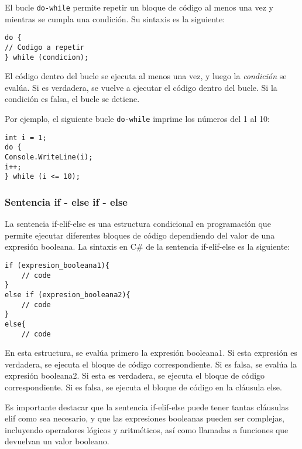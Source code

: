 \documentclass[executivepaper]{article}
\begin{document}
El bucle \verb|do-while| permite repetir un bloque de código al menos una vez y mientras se cumpla una condición. Su sintaxis es la siguiente:

\begin{lstlisting}
do {
// Codigo a repetir
} while (condicion);
\end{lstlisting}

El código dentro del bucle se ejecuta al menos una vez, y luego la \emph{condición} se evalúa. Si es verdadera, se vuelve a ejecutar el código dentro del bucle. Si la condición es falsa, el bucle se detiene.

Por ejemplo, el siguiente bucle \verb|do-while| imprime los números del 1 al 10:

\begin{lstlisting}
int i = 1;
do {
Console.WriteLine(i);
i++;
} while (i <= 10);
\end{lstlisting}

\subsubsection*{Sentencia if - else if - else}
La sentencia if-elif-else es una estructura condicional en programación que permite ejecutar diferentes bloques de código dependiendo del valor de una expresión booleana. La sintaxis en C\# de la sentencia if-elif-else es la siguiente:
\begin{lstlisting}
if (expresion_booleana1){
    // code
}
else if (expresion_booleana2){
    // code
}
else{
    // code
\end{lstlisting}
En esta estructura, se evalúa primero la expresión booleana1. Si esta expresión es verdadera, se ejecuta el bloque de código correspondiente. Si es falsa, se evalúa la expresión booleana2. Si esta es verdadera, se ejecuta el bloque de código correspondiente. Si es falsa, se ejecuta el bloque de código en la cláusula else.

Es importante destacar que la sentencia if-elif-else puede tener tantas cláusulas elif como sea necesario, y que las expresiones booleanas pueden ser complejas, incluyendo operadores lógicos y aritméticos, así como llamadas a funciones que devuelvan un valor booleano.
\end{document}
